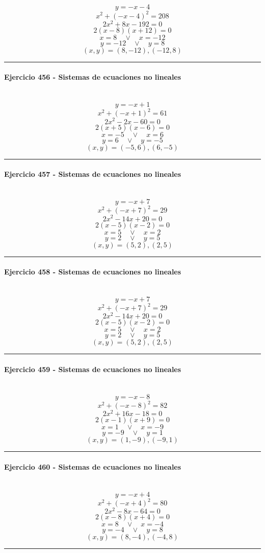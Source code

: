 \documentclass[10pt,a4paper]{article}
\newcommand{\res}[1]{\paragraph{#1}\mbox{}\\[-1.2em]}
\begin{document}
\[ y=-x-4 \]
\[ x^2+(-x-4)^2=208 \]
\[ 2 x^{2} + 8 x - 192=0 \]
\[ 2(x-8)(x+12)=0 \]
\[ x=8\quad \vee \quad x=-12 \]
\[ y=-12\quad \vee \quad y=8 \]
\[ \boxed{(x,y)=(8,-12),(-12,8)} \]
\vspace{1mm}\hrule\vspace{2mm}
\res{Ejercicio 456 - Sistemas de ecuaciones no lineales}
\[ y=-x+1 \]
\[ x^2+(-x+1)^2=61 \]
\[ 2 x^{2} - 2 x - 60=0 \]
\[ 2(x+5)(x-6)=0 \]
\[ x=-5\quad \vee \quad x=6 \]
\[ y=6\quad \vee \quad y=-5 \]
\[ \boxed{(x,y)=(-5,6),(6,-5)} \]
\vspace{1mm}\hrule\vspace{2mm}
\res{Ejercicio 457 - Sistemas de ecuaciones no lineales}
\[ y=-x+7 \]
\[ x^2+(-x+7)^2=29 \]
\[ 2 x^{2} - 14 x + 20=0 \]
\[ 2(x-5)(x-2)=0 \]
\[ x=5\quad \vee \quad x=2 \]
\[ y=2\quad \vee \quad y=5 \]
\[ \boxed{(x,y)=(5,2),(2,5)} \]
\vspace{1mm}\hrule\vspace{2mm}
\res{Ejercicio 458 - Sistemas de ecuaciones no lineales}
\[ y=-x+7 \]
\[ x^2+(-x+7)^2=29 \]
\[ 2 x^{2} - 14 x + 20=0 \]
\[ 2(x-5)(x-2)=0 \]
\[ x=5\quad \vee \quad x=2 \]
\[ y=2\quad \vee \quad y=5 \]
\[ \boxed{(x,y)=(5,2),(2,5)} \]
\vspace{1mm}\hrule\vspace{2mm}
\res{Ejercicio 459 - Sistemas de ecuaciones no lineales}
\[ y=-x-8 \]
\[ x^2+(-x-8)^2=82 \]
\[ 2 x^{2} + 16 x - 18=0 \]
\[ 2(x-1)(x+9)=0 \]
\[ x=1\quad \vee \quad x=-9 \]
\[ y=-9\quad \vee \quad y=1 \]
\[ \boxed{(x,y)=(1,-9),(-9,1)} \]
\vspace{1mm}\hrule\vspace{2mm}
\res{Ejercicio 460 - Sistemas de ecuaciones no lineales}
\[ y=-x+4 \]
\[ x^2+(-x+4)^2=80 \]
\[ 2 x^{2} - 8 x - 64=0 \]
\[ 2(x-8)(x+4)=0 \]
\[ x=8\quad \vee \quad x=-4 \]
\[ y=-4\quad \vee \quad y=8 \]
\[ \boxed{(x,y)=(8,-4),(-4,8)} \]
\vspace{1mm}\hrule\vspace{2mm}
\end{document}
